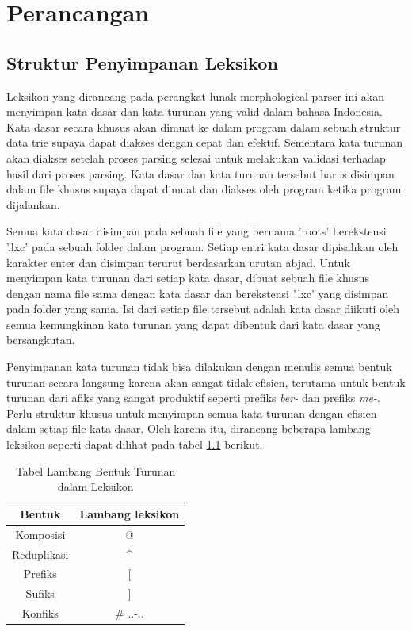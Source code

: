 \chapter{Perancangan}
\label{chap:perancangan}

\section{Struktur Penyimpanan Leksikon}
\label{sec:strukturPenyimpananLeksikon}

Leksikon yang dirancang pada perangkat lunak morphological parser ini akan menyimpan kata dasar dan kata turunan yang valid dalam bahasa Indonesia. Kata dasar secara khusus akan dimuat ke dalam program dalam sebuah struktur data trie supaya dapat diakses dengan cepat dan efektif. Sementara kata turunan akan diakses setelah proses parsing selesai untuk melakukan validasi terhadap hasil dari proses parsing. Kata dasar dan kata turunan tersebut harus disimpan dalam file khusus supaya dapat dimuat dan diakses oleh program ketika program dijalankan.

Semua kata dasar disimpan pada sebuah file yang bernama 'roots' berekstensi '.lxc' pada sebuah folder dalam program. Setiap entri kata dasar dipisahkan oleh karakter enter dan disimpan terurut berdasarkan urutan abjad. Untuk menyimpan kata turunan dari setiap kata dasar, dibuat sebuah file khusus dengan nama file sama dengan kata dasar dan berekstensi '.lxc' yang disimpan pada folder yang sama. Isi dari setiap file tersebut adalah kata dasar diikuti oleh semua kemungkinan kata turunan yang dapat dibentuk dari kata dasar yang bersangkutan.

Penyimpanan kata turunan tidak bisa dilakukan dengan menulis semua bentuk turunan secara langsung karena akan sangat tidak efisien, terutama untuk bentuk turunan dari afiks yang sangat produktif seperti prefiks \textit{ber-} dan prefiks \textit{me-}. Perlu struktur khusus untuk menyimpan semua kata turunan dengan efisien dalam setiap file kata dasar. Oleh karena itu, dirancang beberapa lambang leksikon seperti dapat dilihat pada tabel \ref{tabel-lambang-leksikon} berikut.

\begin{table}[H]
\centering
\begin{tabular}{|c|c|}
\hline
\textbf{Bentuk} & \textbf{Lambang leksikon} \\
\hline
Komposisi&@\\
Reduplikasi&\textasciicircum\\
Prefiks&[\\
Sufiks&]\\
Konfiks&\# ..-..\\
\hline
\end{tabular}
\caption{Tabel Lambang Bentuk Turunan dalam Leksikon} 
\label{tabel-lambang-leksikon}
\end{table}


